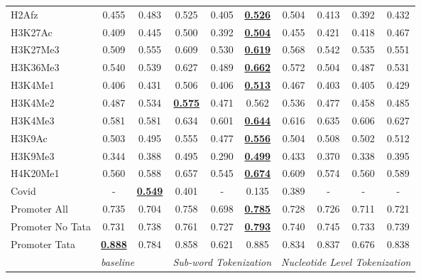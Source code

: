 \begin{table*}[h!]
\begin{center}
\begin{tabular}{l|cc|ccc|cccc}
H2Afz & 0.455 & 0.483 & 0.525 & 0.405 & {\ul \textbf{0.526}} & 0.504 & 0.413 & 0.392 & 0.432 \\
H3K27Ac & 0.409 & 0.445 & 0.500 & 0.392 & {\ul \textbf{0.504}} & 0.455 & 0.421 & 0.418 & 0.467 \\
H3K27Me3 & 0.509 & 0.555 & 0.609 & 0.530 & {\ul \textbf{0.619}} & 0.568 & 0.542 & 0.535 & 0.551 \\
H3K36Me3 & 0.540 & 0.539 & 0.627 & 0.489 & {\ul \textbf{0.662}} & 0.572 & 0.504 & 0.487 & 0.531 \\
H3K4Me1 & 0.406 & 0.431 & 0.506 & 0.406 & {\ul \textbf{0.513}} & 0.467 & 0.403 & 0.405 & 0.429 \\
H3K4Me2 & 0.487 & 0.534 & {\ul \textbf{0.575}} & 0.471 & 0.562 & 0.536 & 0.477 & 0.458 & 0.485 \\
H3K4Me3 & 0.581 & 0.581 & 0.634 & 0.601 & {\ul \textbf{0.644}} & 0.616 & 0.635 & 0.606 & 0.627 \\
H3K9Ac & 0.503 & 0.495 & 0.555 & 0.477 & {\ul \textbf{0.556}} & 0.504 & 0.508 & 0.502 & 0.512 \\
H3K9Me3 & 0.344 & 0.388 & 0.495 & 0.290 & {\ul \textbf{0.499}} & 0.433 & 0.370 & 0.338 & 0.395 \\
H4K20Me1 & 0.560 & 0.588 & 0.657 & 0.545 & {\ul \textbf{0.674}} & 0.609 & 0.574 & 0.560 & 0.589 \\
Covid & - & {\ul \textbf{0.549}} & 0.401 & - & 0.135 & 0.389 & - & - & - \\
Promoter All & 0.735 & 0.704 & 0.758 & 0.698 & {\ul \textbf{0.785}} & 0.728 & 0.726 & 0.711 & 0.721 \\
Promoter No Tata & 0.731 & 0.738 & 0.761 & 0.727 & {\ul \textbf{0.793}} & 0.740 & 0.745 & 0.733 & 0.739 \\
Promoter Tata & {\ul \textbf{0.888}} & 0.784 & 0.858 & 0.621 & 0.885 & 0.834 & 0.837 & 0.676 & 0.838 \\
\hline
 & \multicolumn{2}{l|}{\textit{baseline}} & \multicolumn{3}{c|}{\textit{Sub-word Tokenization}} & \multicolumn{4}{c}{\textit{Nucleotide Level Tokenization}} \\ \hline
\end{tabular}
\end{center}
\end{table*}